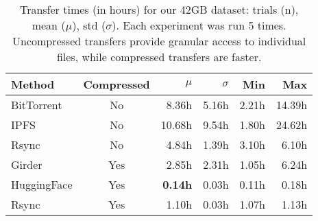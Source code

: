 \begin{table}[hb]
\caption{
Transfer times (in hours) for our 42GB dataset: trials (n), mean ($\mu$), std ($\sigma$).
Each experiment was run 5 times.
Uncompressed transfers provide granular access to individual files, while compressed transfers are faster.
}
\label{tab:transfertime}
\centering
\setlength{\tabcolsep}{4.5pt} %
\begin{tabular}{lcrrrr}
\toprule
Method       & Compressed & $\mu$     & $\sigma$ & Min    & Max     \\
\midrule       
BitTorrent   & No         & 8.36h     & 5.16h    & 2.21h  & 14.39h  \\
IPFS         & No         & 10.68h    & 9.54h    & 1.80h  & 24.62h  \\
Rsync        & No         & 4.84h     & 1.39h    & 3.10h  & 6.10h   \\
Girder       & Yes        & 2.85h     & 2.31h    & 1.05h  & 6.24h   \\
HuggingFace  & Yes        & \bf{0.14h}& 0.03h    & 0.11h  & 0.18h   \\
Rsync        & Yes        & 1.10h     & 0.03h    & 1.07h  & 1.13h   \\
\bottomrule
\end{tabular}
\end{table}
